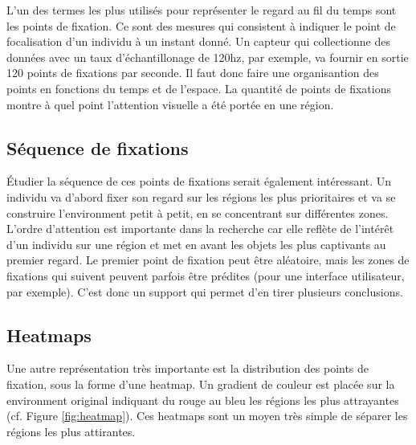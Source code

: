 \documentclass[12pt]{article}
\begin{document}
L'un des termes les plus utilisés pour représenter le regard au fil du temps
sont les points de fixation. Ce sont des mesures qui consistent à indiquer
le point de focalisation d'un individu à un instant donné. Un capteur qui
collectionne des données avec un taux d'échantillonage de 120hz, par exemple, va
fournir en sortie 120 points de fixations par seconde. Il faut donc faire une
organisantion des points en fonctions du temps et de l'espace. La quantité de
points de fixations montre à quel point l'attention visuelle a été portée en une
région.

\subsection{Séquence de fixations}

Étudier la séquence de ces points de fixations serait également intéressant. Un
individu va d'abord fixer son regard sur les régions les plus prioritaires et va
se construire l'environment petit à petit, en se concentrant sur différentes
zones. L'ordre d'attention est importante dans la recherche car elle reflète de
l'intérêt d'un individu sur une région et met en avant les objets les plus
captivants au premier regard. Le premier point de fixation peut être aléatoire,
mais les zones de fixations qui suivent peuvent parfois être prédites (pour
une interface utilisateur, par exemple). C'est donc un support qui permet d'en
tirer plusieurs conclusions.

\subsection{Heatmaps}

Une autre représentation très importante est la distribution des points de
fixation, sous la forme d'une heatmap. Un gradient de couleur est placée sur la
environment original indiquant du rouge au bleu les régions les plus
attrayantes (cf. Figure \ref{fig:heatmap}). Ces heatmaps sont un moyen très
simple de séparer les régions les plus attirantes.
\end{document}

